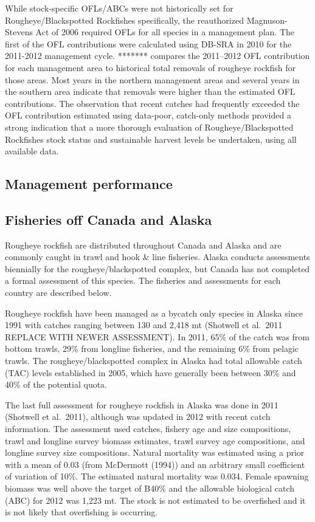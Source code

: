 \documentclass[
]{scrartcl}
\begin{document}
While stock-specific OFLs/ABCs were not historically set for
Rougheye/Blackspotted Rockfishes specifically, the reauthorized
Magnuson-Stevens Act of 2006 required OFLs for all species in a
management plan. The first of the OFL contributions were calculated
using DB-SRA in 2010 for the 2011-2012 management cycle. *******
compares the 2011--2012 OFL contribution for each management area to
historical total removals of rougheye rockfish for those areas. Most
years in the northern management areas and several years in the southern
area indicate that removals were higher than the estimated OFL
contributions. The observation that recent catches had frequently
exceeded the OFL contribution estimated using data-poor, catch-only
methods provided a strong indication that a more thorough evaluation of
Rougheye/Blackspotted Rockfishes stock status and sustainable harvest
levels be undertaken, using all available data.

\subsection{Management performance}\label{management-performance-1}

\subsection{Fisheries off Canada and
Alaska}\label{fisheries-off-canada-and-alaska}

Rougheye rockfish are distributed throughout Canada and Alaska and are
commonly caught in trawl and hook \& line fisheries. Alaska conducts
assessments biennially for the rougheye/blackspotted complex, but Canada
has not completed a formal assessment of this species. The fisheries and
assessments for each country are described below.

Rougheye rockfish have been managed as a bycatch only species in Alaska
since 1991 with catches ranging between 130 and 2,418 mt (Shotwell et
al.~2011 REPLACE WITH NEWER ASSESSMENT). In 2011, 65\% of the catch was
from bottom trawls, 29\% from longline fisheries, and the remaining 6\%
from pelagic trawls. The rougheye/blackspotted complex in Alaska had
total allowable catch (TAC) levels established in 2005, which have
generally been between 30\% and 40\% of the potential quota.

The last full assessment for rougheye rockfish in Alaska was done in
2011 (Shotwell et al.~2011), although was updated in 2012 with recent
catch information. The assessment used catches, fishery age and size
compositions, trawl and longline survey biomass estimates, trawl survey
age compositions, and longline survey size compositions. Natural
mortality was estimated using a prior with a mean of 0.03 (from
McDermott (1994)) and an arbitrary small coefficient of variation of
10\%. The estimated natural mortality was 0.034. Female spawning biomass
was well above the target of B40\% and the allowable biological catch
(ABC) for 2012 was 1,223 mt. The stock is not estimated to be overfished
and it is not likely that overfishing is occurring.
\end{document}
